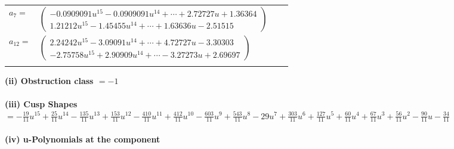 \documentclass[1p]{elsarticle_modified}
\theoremstyle{definition}
\begin{document}
\begin{tabular}{m{7pt} m{180pt} m{7pt} m{180pt} }
\flushright $a_{7}=$&$\begin{pmatrix}-0.0909091 u^{15}-0.0909091 u^{14}+\cdots+2.72727 u+1.36364\\1.21212 u^{15}-1.45455 u^{14}+\cdots+1.63636 u-2.51515\end{pmatrix}$ \\
\flushright $a_{12}=$&$\begin{pmatrix}2.24242 u^{15}-3.09091 u^{14}+\cdots+4.72727 u-3.30303\\-2.75758 u^{15}+2.90909 u^{14}+\cdots-3.27273 u+2.69697\end{pmatrix}$\\&\end{tabular}
\flushleft \textbf{(ii) Obstruction class $= -1$}\\~\\
\flushleft \textbf{(iii) Cusp Shapes $= -\frac{19}{11} u^{15}+\frac{25}{11} u^{14}-\frac{135}{11} u^{13}+\frac{153}{11} u^{12}-\frac{410}{11} u^{11}+\frac{412}{11} u^{10}-\frac{603}{11} u^9+\frac{543}{11} u^8-29 u^7+\frac{303}{11} u^6+\frac{127}{11} u^5+\frac{60}{11} u^4+\frac{67}{11} u^3+\frac{56}{11} u^2-\frac{90}{11} u-\frac{34}{11}$}\\~\\
\newpage\renewcommand{\arraystretch}{1}
\flushleft \textbf{(iv) u-Polynomials at the component}\newline \\
\end{document}
